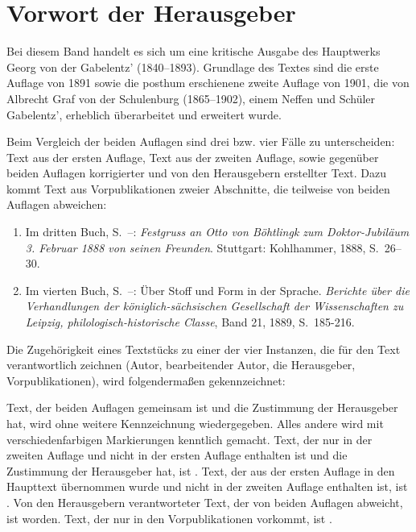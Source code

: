 \chapter*{Vorwort der Herausgeber}

Bei diesem Band handelt es sich um eine kritische Ausgabe des Hauptwerks Georg von der Gabelentz' (1840–1893). Grundlage des Textes sind die erste Auflage von 1891 sowie die posthum erschienene zweite Auflage von 1901, die von Albrecht Graf von der Schulenburg (1865–1902), einem Neffen und Schüler Gabelentz', erheblich überarbeitet und erweitert wurde. 

Beim Vergleich der beiden Auflagen sind drei bzw. vier Fälle zu unterscheiden: Text aus der ersten Auflage, Text aus der zweiten Auflage, sowie gegenüber beiden Auflagen korrigierter und von den Herausgebern erstellter Text. Dazu kommt Text aus Vorpublikationen zweier Abschnitte, die teilweise von beiden Auflagen abweichen:

\begin{enumerate}[1.]
\item Im dritten Buch, S.~\pageref{III.II.II.8}–\pageref{III.II.II.9}: \textit{Festgruss an Otto von Böhtlingk zum Doktor-Jubiläum 3. Februar 1888 von seinen Freunden}. Stuttgart: Kohlhammer, 1888, S.~26–30.
\item Im vierten Buch, S.~\pageref{IV.III.II.1}–\pageref{IV.III.III}: Über Stoff und Form in der Sprache. \textit{Berichte über die Verhandlungen der königlich-sächsischen Gesellschaft der Wissenschaften zu Leipzig, philologisch-historische Classe}, Band 21, 1889, S.~185-216.
\end{enumerate}

Die Zugehörigkeit eines Textstücks zu einer der vier Instanzen, die für den Text verantwortlich zeichnen (Autor, bearbeitender Autor, die Herausgeber, Vorpublikationen), wird folgendermaßen gekennzeichnet:

Text, der beiden Auflagen gemeinsam ist und die Zustimmung der Herausgeber hat, wird ohne wei­tere Kennzeichnung wiedergegeben. Alles andere wird mit verschiedenfarbigen Mar­kierungen kenntlich gemacht. Text, der nur in der zweiten Auflage und nicht in der ersten Auflage enthalten ist und die Zustimmung der Herausgeber hat, ist . Text, der aus der ersten Auflage in den Haupttext übernommen wurde und nicht in der zweiten Auflage enthalten ist, ist . Von den Herausgebern verantworteter Text, der von beiden Auflagen abweicht, ist  worden. Text, der nur in den Vorpublikationen vorkommt, ist .

